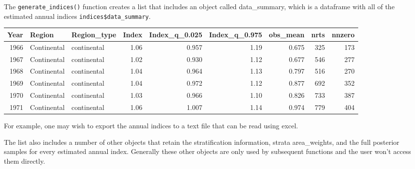 \documentclass[
]{book}
\newenvironment{Shaded}{\begin{snugshade}}{\end{snugshade}}
\newcommand{\DecValTok}[1]{\textcolor[rgb]{0.00,0.00,0.81}{#1}}
\newcommand{\FunctionTok}[1]{\textcolor[rgb]{0.00,0.00,0.00}{#1}}
\newcommand{\NormalTok}[1]{#1}
\newcommand{\SpecialCharTok}[1]{\textcolor[rgb]{0.00,0.00,0.00}{#1}}
\newcommand{\StringTok}[1]{\textcolor[rgb]{0.31,0.60,0.02}{#1}}
\begin{document}
The \texttt{generate\_indices()} function creates a list that includes an object called data\_summary, which is a dataframe with all of the estimated annual indices \texttt{indices\$data\_summary}.

\begin{Shaded}
\end{Shaded}

\begin{tabular}{r|l|l|r|r|r|r|r|r}
\hline
Year & Region & Region\_type & Index & Index\_q\_0.025 & Index\_q\_0.975 & obs\_mean & nrts & nnzero\\
\hline
1966 & Continental & continental & 1.06 & 0.957 & 1.19 & 0.675 & 325 & 173\\
\hline
1967 & Continental & continental & 1.02 & 0.930 & 1.12 & 0.677 & 546 & 277\\
\hline
1968 & Continental & continental & 1.04 & 0.964 & 1.13 & 0.797 & 516 & 270\\
\hline
1969 & Continental & continental & 1.04 & 0.972 & 1.12 & 0.877 & 692 & 352\\
\hline
1970 & Continental & continental & 1.03 & 0.966 & 1.10 & 0.826 & 733 & 387\\
\hline
1971 & Continental & continental & 1.06 & 1.007 & 1.14 & 0.974 & 779 & 404\\
\hline
\end{tabular}

For example, one may wish to export the annual indices to a text file that can be read using excel.

\begin{Shaded}
\end{Shaded}

The list also includes a number of other objects that retain the stratification information, strata area\_weights, and the full posterior samples for every estimated annual index. Generally these other objects are only used by subsequent functions and the user won't access them directly.
\end{document}
